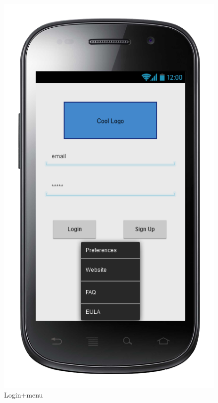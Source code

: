 \begin{center}
\begin{figure} [h]
  	  \includegraphics[scale=0.5]{ui/Login + menu.png}
\caption{Login+menu}
   
	\end{figure}
\end{center}

